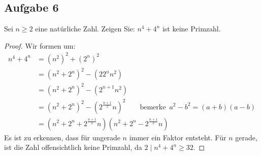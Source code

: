 \subsection{Aufgabe 6}
Sei $n \geq 2$ eine natürliche Zahl. Zeigen Sie: $n^4 + 4^n$ ist keine Primzahl.
\begin{proof}
  Wir formen um:
  \begin{equation*}
    \begin{aligned}
      n^4 + 4^n & = (n^2)^2 + (2^n)^2                                                \\
                & = (n^2 + 2^n)^2 - (22^nn^2)                                        \\
                & = (n^2 + 2^n)^2 - (2^{n+1}n^2)                                     \\
                & = (n^2 + 2^n)^2 - (2^{\frac{n+1}{2}}n)^2
      \qquad \text{bemerke} \enspace a^2 - b^2 = (a + b)(a - b)                      \\
                & = (n^2 + 2^n + 2^{\frac{n+1}{2}}n)(n^2 + 2^n - 2^{\frac{n+1}{2}}n)
    \end{aligned}
  \end{equation*}
  Es ist zu erkennen, dass für ungerade $n$ immer ein Faktor entsteht.
  Für $n$ gerade, ist die Zahl offensichtlich keine Primzahl,
  da $2 \mid n^4 + 4^n \geq 32$.
\end{proof}
